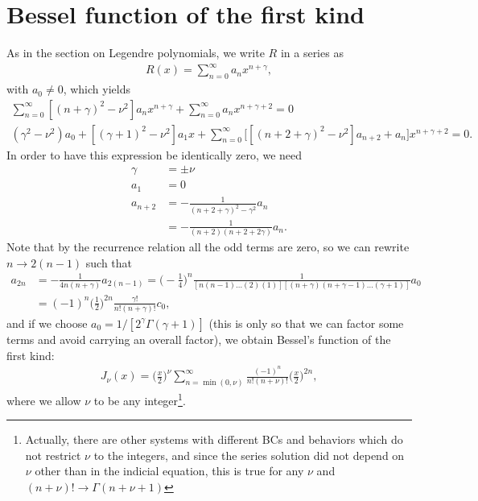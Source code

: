 \section{Bessel function of the first kind}

As in the section on Legendre polynomials, we write $R$ in a series as
\begin{eqnarray}
    R(x) = \sum_{n=0}^{\infty} a_{n} x^{n + \gamma}
,\end{eqnarray}
with $a_0 \ne 0$, which yields
\begin{gather}
    \sum_{n=0}^{\infty} [ (n + \gamma)^2 - \nu^2] a_{n} x^{n+\gamma} + \sum_{n=0}^{\infty} a_{n} x^{n+\gamma+2} = 0 \nonumber \\
    (\gamma^2 - \nu^2)a_0 + [(\gamma+1)^2 - \nu^2] a_1 x + \sum_{n=0}^{\infty} \Big[ [(n+2+\gamma)^2 - \nu^2]a_{n+2} + a_{n} \Big] x^{n+\gamma+2} = 0
.\end{gather}
In order to have this expression be identically zero, we need
\begin{align}
    \gamma &= \pm \nu \\
    a_1 &= 0 \\
    a_{n+2} &= -\frac{1}{(n+2+\gamma)^2 - \gamma^2}a_{n} \nonumber \\
            &= -\frac{1}{(n+2)(n+2+2\gamma)} a_{n}
.\end{align}
Note that by the recurrence relation all the odd terms are zero, so we can rewrite $n \rightarrow 2(n-1)$ such that
\begin{align}
    a_{2n} &= -\frac{1}{4n(n+\gamma)} a_{2(n-1)} = \Big( - \frac{1}{4} \Big)^{n} \frac{1}{[n(n-1)\ldots(2)(1)][(n+\gamma)(n+\gamma-1)\ldots(\gamma+1)]} a_0 \nonumber \\
           &= (-1)^{n} \Big( \frac{1}{2} \Big)^{2n} \frac{\gamma!}{n!(n+\gamma)!} c_0
,\end{align}
and if we choose $a_0 = 1/[2^{\gamma} \Gamma(\gamma+1)]$ (this is only so that we can factor some terms and avoid carrying an overall factor), we obtain Bessel's function of the first kind:
\begin{align}
    J_{\nu}(x) = \Big( \frac{x}{2} \Big)^{\nu} \sum_{n=\min(0,\nu)}^{\infty} \frac{(-1)^{n}}{n!(n+\nu)!} \Big( \frac{x}{2} \Big)^{2n}
,\end{align}
where we allow $\nu$ to be any integer\footnote{Actually, there are other systems with different BCs and behaviors which do not restrict $\nu$ to the integers, and since the series solution did not depend on $\nu$ other than in the indicial equation, this is true for any $\nu$ and $(n+\nu)! \rightarrow \Gamma(n+\nu+1)$}.

